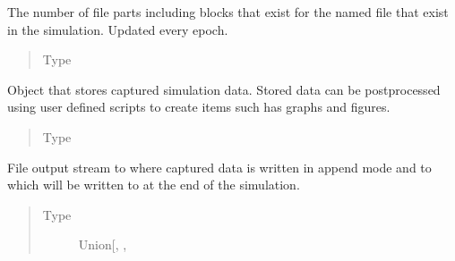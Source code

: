 \documentclass[letterpaper,10pt,english]{sphinxmanual}
\begin{document}
\begin{fulllineitems}
\begin{fulllineitems}
\end{fulllineitems}


\begin{fulllineitems}
\label{\detokenize{app.domain.helpers:app.domain.helpers.smart_dataclasses.FileData.existing_replicas}}
The number of file parts including blocks that exist for the
named file that exist in the simulation. Updated every epoch.
\begin{quote}\begin{description}
\item[{Type}] \leavevmode
{}

\end{description}\end{quote}

\end{fulllineitems}


\begin{fulllineitems}
\label{\detokenize{app.domain.helpers:app.domain.helpers.smart_dataclasses.FileData.logger}}
Object that stores captured simulation data. Stored data can be
post\sphinxhyphen{}processed using user defined scripts to create items such
has graphs and figures.
\begin{quote}\begin{description}
\item[{Type}] \leavevmode
{\hyperref[\detokenize{app.domain.helpers:app.domain.helpers.smart_dataclasses.LoggingData}]{}}

\end{description}\end{quote}

\end{fulllineitems}


\begin{fulllineitems}
\label{\detokenize{app.domain.helpers:app.domain.helpers.smart_dataclasses.FileData.out_file}}
File output stream to where captured data is written in append
mode and to which  will be written to at the end of the
simulation.
\begin{quote}\begin{description}
\item[{Type}] \leavevmode
Union{[}, , \sphinxhref{https://docs.python.org/3.7/library/functions.html\#int}{int}{]}


\end{description}
\end{quote}
\end{fulllineitems}
\end{fulllineitems}
\end{document}
